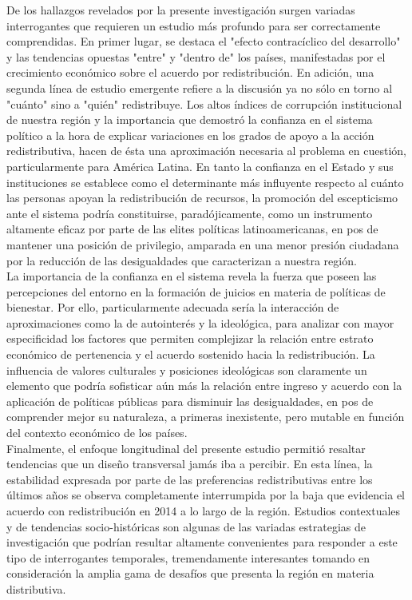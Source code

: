 \documentclass[12pt,letterpaper]{article}
\begin{document}
De los hallazgos revelados por la presente investigación surgen variadas interrogantes que requieren un estudio más profundo para ser correctamente comprendidas. En primer lugar, se destaca el "efecto contracíclico del desarrollo" y las tendencias opuestas "entre" y "dentro de" los países, manifestadas por el crecimiento económico sobre el acuerdo por redistribución. En adición, una segunda línea de estudio emergente refiere a la discusión ya no sólo en torno al "cuánto" sino a "quién" redistribuye. Los altos índices de corrupción institucional de nuestra región y la importancia que demostró la confianza en el sistema político a la hora de explicar variaciones en los grados de apoyo a la acción redistributiva, hacen de ésta una aproximación necesaria al problema en cuestión, particularmente para América Latina. En tanto la confianza en el Estado y sus instituciones se establece como el determinante más influyente respecto al cuánto las personas apoyan la redistribución de recursos, la promoción del escepticismo ante el sistema podría constituirse, paradójicamente, como un instrumento altamente eficaz por parte de las elites políticas latinoamericanas, en pos de mantener una posición de privilegio, amparada en una menor presión ciudadana por la reducción de las desigualdades que caracterizan a nuestra región.\\

La importancia de la confianza en el sistema revela la fuerza que poseen las percepciones del entorno en la formación de juicios en materia de políticas de bienestar. Por ello, particularmente adecuada sería la interacción de aproximaciones como la de autointerés y la ideológica, para analizar con mayor especificidad los factores que permiten complejizar la relación entre estrato económico de pertenencia y el acuerdo sostenido hacia la redistribución. La influencia de valores culturales y posiciones ideológicas son claramente un elemento que podría sofisticar aún más la relación entre ingreso y acuerdo con la aplicación de políticas públicas para disminuir las desigualdades, en pos de comprender mejor su naturaleza, a primeras inexistente, pero mutable en función del contexto económico de los países. \\

Finalmente, el enfoque longitudinal del presente estudio permitió resaltar tendencias que un diseño transversal jamás iba a percibir. En esta línea, la estabilidad expresada por parte de las preferencias redistributivas entre los últimos años se observa completamente interrumpida por la baja que evidencia el acuerdo con redistribución en 2014 a lo largo de la región. Estudios contextuales y de tendencias socio-históricas son algunas de las variadas estrategias de investigación que podrían resultar altamente convenientes para responder a este tipo de interrogantes temporales, tremendamente interesantes tomando en consideración la amplia gama de desafíos que presenta la región en materia distributiva.
\end{document}
